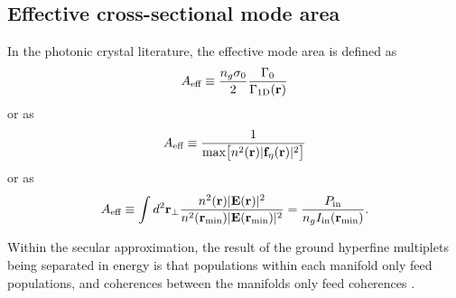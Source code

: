 \documentclass[preprint,aps,pra,onecolumn]{revtex4-1} %
\newcommand{\oneD}{{\rm 1D}}
\newcommand{\inp}{{\rm in}}
\newcommand{\change}[1]{{\color{RoyalBlue} #1}}
\begin{document}
\begin{appendix}
\change{
\section{Effective cross-sectional mode area} \label{Appendix::ModeArea}
In the photonic crystal literature, the effective mode area is defined as \cite{goban_atomlight_2014}
	\begin{align}
		A_\eff \equiv \frac{n_g \sigma_0}{2} \frac{\Gamma_0}{\Gamma_\oneD(\mathbf{r})}
	\end{align}
or as \cite{manga_rao_single_2007}
	\begin{align}
		A_{\text{eff}} \equiv \frac{1}{ \mbox{max} \big[ n^2(\mathbf{r}) |\mathbf{f}_\eta(\mathbf{r})|^2 \big]}
	\end{align}
or as \cite{hung_trapped_2013}
	\begin{align}
		A_\eff \equiv \int d^2 \mathbf{r}_\perp \frac{n^2(\mathbf{r}) |\mathbf{E}(\mathbf{r})|^2 }{n^2(\mathbf{r}_{\rm min}) |\mathbf{E}(\mathbf{r}_{\rm min})|^2 } =  \frac{P_\inp}{ n_g  I_\inp(\mathbf{r}_{\rm min}) }.
	\end{align}
	
Within the secular approximation, the result of the ground hyperfine multiplets being separated in energy is that populations within each manifold only feed populations, and coherences between the manifolds only feed coherences \cite{deutsch_quantum_2010}.  
}

\end{appendix}
\end{document}
